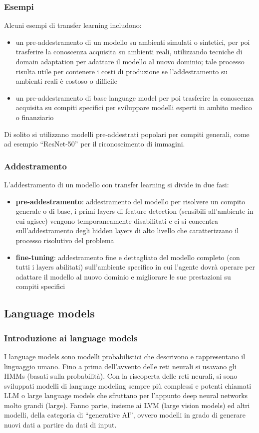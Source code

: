\subsubsection*{Esempi}
Alcuni esempi di transfer learning includono:
\begin{itemize}
	\item un pre-addestramento di un modello su ambienti simulati o sintetici, per poi trasferire la conoscenza acquisita su
	ambienti reali, utilizzando tecniche di domain adaptation per adattare il modello al nuovo dominio; tale processo risulta
	utile per contenere i costi di produzione se l'addestramento su ambienti reali è costoso o difficile
	\item un pre-addestramento di base language model per poi trasferire la conoscenza acquisita su compiti specifici per
	sviluppare modelli esperti in ambito medico o finanziario
\end{itemize}
Di solito si utilizzano modelli pre-addestrati popolari per compiti generali, come ad esempio ``ResNet-50'' per il riconoscimento
di immagini.

\subsubsection*{Addestramento}
L'addestramento di un modello con transfer learning si divide in due fasi:
\begin{itemize}
	\item \textbf{pre-addestramento}: addestramento del modello per risolvere un compito generale o di base, i primi layers
	di feature detection (sensibili all'ambiente in cui agisce) vengono temporaneamente disabilitati e ci si concentra
	sull'addestramento degli hidden layers di alto livello che caratterizzano il processo risolutivo del problema
	\item \textbf{fine-tuning}: addestramento fine e dettagliato del modello completo (con tutti i layers abilitati)
	sull'ambiente specifico in cui l'agente dovrà operare per adattare il modello al nuovo dominio e migliorare le
	sue prestazioni su compiti specifici
\end{itemize}

\subsection{Language models}
\subsubsection*{Introduzione ai language models}
I language models sono modelli probabilistici che descrivono e rappresentano il linguaggio umano. Fino a prima dell'avvento
delle reti neurali si usavano gli HMMs (basati sulla probabilità). Con la riscoperta delle reti neurali, si sono sviluppati
modelli di language modeling sempre più complessi e potenti chiamati LLM o large language models che sfruttano per l'appunto
deep neural networks molto grandi (large). Fanno parte, insieme ai LVM (large vision models) ed altri modelli, della
categoria di ``generative AI'', ovvero modelli in grado di generare nuovi dati a partire da dati di input.

